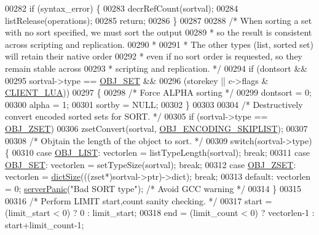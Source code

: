 \begin{DoxyCode}
00282     \textcolor{keywordflow}{if} (syntax\_error) \{
00283         decrRefCount(sortval);
00284         listRelease(operations);
00285         \textcolor{keywordflow}{return};
00286     \}
00287 
00288     \textcolor{comment}{/* When sorting a set with no sort specified, we must sort the output}
00289 \textcolor{comment}{     * so the result is consistent across scripting and replication.}
00290 \textcolor{comment}{     *}
00291 \textcolor{comment}{     * The other types (list, sorted set) will retain their native order}
00292 \textcolor{comment}{     * even if no sort order is requested, so they remain stable across}
00293 \textcolor{comment}{     * scripting and replication. */}
00294     \textcolor{keywordflow}{if} (dontsort &&
00295         sortval->type == \hyperlink{server_8h_a8d179375a4aac33d3fa7aa80c8ccc75f}{OBJ\_SET} &&
00296         (storekey || c->flags & \hyperlink{server_8h_af9d0b0f45ef2c1fd29ac714a300de706}{CLIENT\_LUA}))
00297     \{
00298         \textcolor{comment}{/* Force ALPHA sorting */}
00299         dontsort = 0;
00300         alpha = 1;
00301         sortby = NULL;
00302     \}
00303 
00304     \textcolor{comment}{/* Destructively convert encoded sorted sets for SORT. */}
00305     \textcolor{keywordflow}{if} (sortval->type == \hyperlink{server_8h_a8c356422ddbc03bd77694880a30a1953}{OBJ\_ZSET})
00306         zsetConvert(sortval, \hyperlink{server_8h_acfb35db5cb30ed113ed23aeb1a224c4c}{OBJ\_ENCODING\_SKIPLIST});
00307 
00308     \textcolor{comment}{/* Objtain the length of the object to sort. */}
00309     \textcolor{keywordflow}{switch}(sortval->type) \{
00310     \textcolor{keywordflow}{case} \hyperlink{server_8h_a4a5f22a280949c97a0cb0d4213275126}{OBJ\_LIST}: vectorlen = listTypeLength(sortval); \textcolor{keywordflow}{break};
00311     \textcolor{keywordflow}{case} \hyperlink{server_8h_a8d179375a4aac33d3fa7aa80c8ccc75f}{OBJ\_SET}: vectorlen =  setTypeSize(sortval); \textcolor{keywordflow}{break};
00312     \textcolor{keywordflow}{case} \hyperlink{server_8h_a8c356422ddbc03bd77694880a30a1953}{OBJ\_ZSET}: vectorlen = \hyperlink{dict_8h_af193430dd3d5579a52b194512f72c1f0}{dictSize}(((zset*)sortval->ptr)->dict); \textcolor{keywordflow}{break};
00313     \textcolor{keywordflow}{default}: vectorlen = 0; \hyperlink{server_8h_a11cc378e7778a830b41240578de3b204}{serverPanic}(\textcolor{stringliteral}{"Bad SORT type"}); \textcolor{comment}{/* Avoid GCC warning */}
00314     \}
00315 
00316     \textcolor{comment}{/* Perform LIMIT start,count sanity checking. */}
00317     start = (limit\_start < 0) ? 0 : limit\_start;
00318     end = (limit\_count < 0) ? vectorlen-1 : start+limit\_count-1;

\end{DoxyCode}
